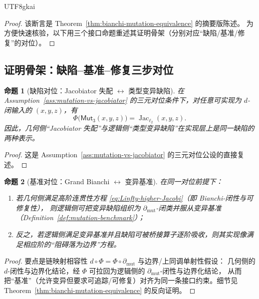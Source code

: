 \documentclass[12pt]{article}
\newtheorem{proposition}{命题}[section]
\newcommand{\Layer}{\ensuremath{\ell}}
\newcommand{\Jac}{\operatorname{Jac}}
\begin{document}
\begin{CJK*}{UTF8}{gkai}
\begin{proof}
该断言是 Theorem~\ref{thm:bianchi-mutation-equivalence} 的摘要版陈述。
为方便快速核验，以下用三个接口命题重述其证明骨架（分别对应“缺陷/基准/修复”的对位）。
\end{proof}

\subsection{证明骨架：缺陷--基准--修复三步对位}

\begin{proposition}[缺陷对位：Jacobiator 失配 $\leftrightarrow$ 类型变异缺陷]
\label{prop:equiv-defect}
在 Assumption~\ref{ass:mutation-vs-jacobiator} 的三元对位条件下，对任意可实现为 $d$-闭输入的 $(x,y,z)$，有
\[
  \Phi\bigl(\mathsf{Mut}_3(x,y,z)\bigr)=\Jac_{\Layer_2}(x,y,z).
\]
因此，几何侧“Jacobiator 失配”与逻辑侧“类型变异缺陷”在实现层上是同一缺陷的两种表示。
\end{proposition}

\begin{proof}
这是 Assumption~\ref{ass:mutation-vs-jacobiator} 的三元对位公设的直接复述。
\end{proof}

\begin{proposition}[基准对位：Grand Bianchi $\leftrightarrow$ 变异基准]
\label{prop:equiv-benchmark}
在同一对位前提下：
\begin{enumerate}
  \item 若几何侧满足高阶连贯性方程 \eqref{eq:Linfty-higher-Jacobi}（即 Bianchi-闭性与可修复性），
        则逻辑侧可把变异缺陷组织为 $\partial_{\mathrm{mut}}$-闭类并服从变异基准（Definition~\ref{def:mutation-benchmark}）；
  \item 反之，若逻辑侧满足变异基准并且缺陷可被桥接算子逐阶吸收，则其实现像满足相应阶的“阻碍落为边界”方程。
\end{enumerate}
\end{proposition}

\begin{proof}
要点是链映射相容性 $d\circ\Phi=\Phi\circ\partial_{\mathrm{mut}}$ 与边界/上同调单射性假设：
几何侧的 $d$-闭性与边界化结论，经 $\Phi$ 可拉回为逻辑侧的 $\partial_{\mathrm{mut}}$-闭性与边界化结论，
从而把“基准”（允许变异但要求可追踪/可修复）对齐为同一条接口约束。细节见 Theorem~\ref{thm:bianchi-mutation-equivalence} 的反向证明。
\end{proof}


\end{CJK*}
\end{document}

